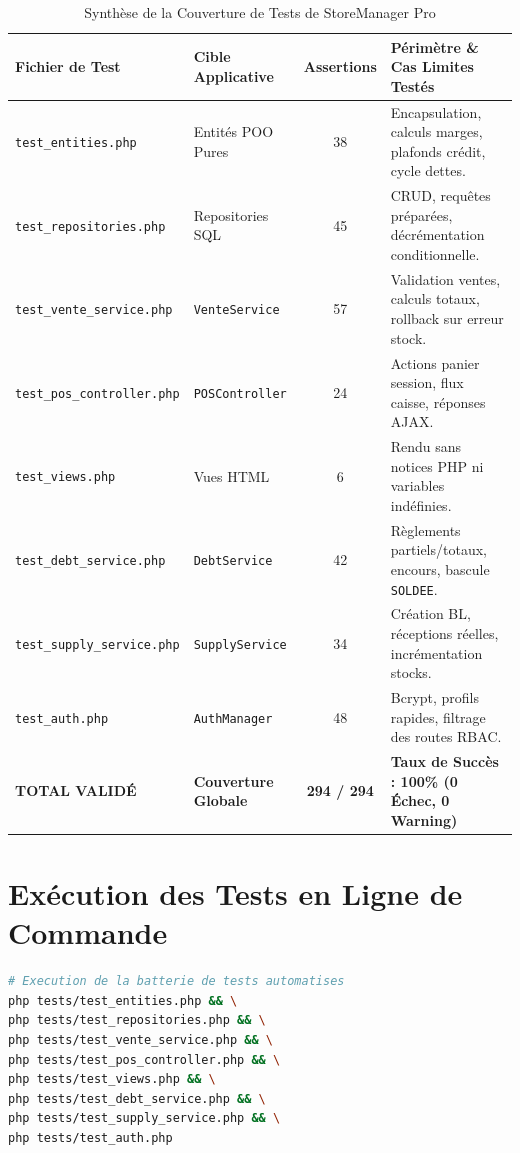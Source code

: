 \documentclass[11pt,a4paper,titlepage,twoside,openright]{report}
\begin{document}
\begin{table}[htbp]
\centering
\small
\begin{tabularx}{\textwidth}{llcX}
\toprule
\textbf{Fichier de Test} & \textbf{Cible Applicative} & \textbf{Assertions} & \textbf{Périmètre \& Cas Limites Testés} \\
\midrule
\texttt{test\_entities.php} & Entités POO Pures & 38 & Encapsulation, calculs marges, plafonds crédit, cycle dettes. \\
\texttt{test\_repositories.php} & Repositories SQL & 45 & CRUD, requêtes préparées, décrémentation conditionnelle. \\
\texttt{test\_vente\_service.php} & \texttt{VenteService} & 57 & Validation ventes, calculs totaux, rollback sur erreur stock. \\
\texttt{test\_pos\_controller.php} & \texttt{POSController} & 24 & Actions panier session, flux caisse, réponses AJAX. \\
\texttt{test\_views.php} & Vues HTML & 6 & Rendu sans notices PHP ni variables indéfinies. \\
\texttt{test\_debt\_service.php} & \texttt{DebtService} & 42 & Règlements partiels/totaux, encours, bascule \texttt{SOLDEE}. \\
\texttt{test\_supply\_service.php} & \texttt{SupplyService} & 34 & Création BL, réceptions réelles, incrémentation stocks. \\
\texttt{test\_auth.php} & \texttt{AuthManager} & 48 & Bcrypt, profils rapides, filtrage des routes RBAC. \\
\midrule
\textbf{TOTAL VALIDÉ} & \textbf{Couverture Globale} & \textbf{294 / 294} & \textbf{Taux de Succès : 100\% (0 Échec, 0 Warning)} \\
\bottomrule
\end{tabularx}
\caption{Synthèse de la Couverture de Tests de StoreManager Pro}
\label{tab:test_summary}
\end{table}

\section{Exécution des Tests en Ligne de Commande}

\begin{lstlisting}[language=bash, caption={Commande d'exécution de la suite complète de tests}]
# Execution de la batterie de tests automatises
php tests/test_entities.php && \
php tests/test_repositories.php && \
php tests/test_vente_service.php && \
php tests/test_pos_controller.php && \
php tests/test_views.php && \
php tests/test_debt_service.php && \
php tests/test_supply_service.php && \
php tests/test_auth.php
\end{lstlisting}
\end{document}
